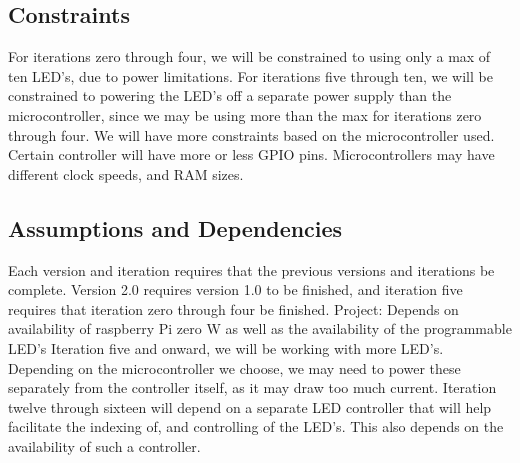 \documentclass[onecolumn, draftclsnofoot,10pt, compsoc]{IEEEtran}
\begin{document}
		\subsection*{Constraints}
		For iterations zero through four, we will be constrained to using only a max of ten LED’s, due to power limitations. For iterations five through ten, we will be constrained to powering the LED’s off a separate power supply than the microcontroller,
		since we may be using more than the max for iterations zero through four. We will have more constraints based on the microcontroller used. Certain controller will have more or less GPIO pins. Microcontrollers may have different clock speeds, and RAM sizes.

		\subsection*{Assumptions and Dependencies}
		Each version and iteration requires that the previous versions and iterations be complete. Version 2.0 requires version 1.0 to be finished, and iteration five requires that iteration zero through four be finished.
		Project: Depends on availability of raspberry Pi zero W as well as the availability of the programmable LED’s
		Iteration five and onward, we will be working with more LED’s. Depending on the microcontroller we choose, we may need to power these separately from the controller itself, as it may draw too much current.
		Iteration twelve through sixteen will depend on a separate LED controller that will help facilitate the indexing of, and controlling of the LED’s. This also depends on the availability of such a controller.
\end{document}
